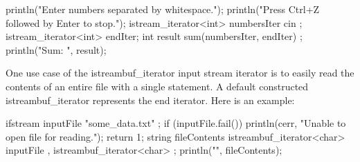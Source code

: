 \begin{cpp}
println("Enter numbers separated by whitespace.");
println("Press Ctrl+Z followed by Enter to stop.");
istream_iterator<int> numbersIter { cin };
istream_iterator<int> endIter;
int result { sum(numbersIter, endIter) };
println("Sum: {}", result);
\end{cpp}



One use case of the istreambuf\_iterator input stream iterator is to easily read the contents of an entire file with a single statement. A default constructed istreambuf\_iterator represents the end iterator. Here is an example:

\begin{cpp}
ifstream inputFile { "some_data.txt" };
if (inputFile.fail()) {
    println(cerr, "Unable to open file for reading.");
    return 1;
}
string fileContents {
    istreambuf_iterator<char> { inputFile },
    istreambuf_iterator<char> { }
};
println("{}", fileContents);
\end{cpp}














